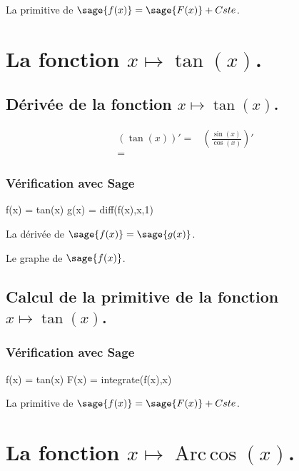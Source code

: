 \documentclass[a4paper,14pt]{extreport} %
\renewcommand{\arccos}{\mathop{\mathrm{Arc\,cos}}}
\begin{document}
La primitive de $\sage{f(x)} = \sage{F(x)} + Cste $.



\section{La fonction  $x \mapsto \tan(x)$.}

\subsection{Dérivée de la fonction $x \mapsto \tan(x)$.}


\begin{align*}
(\tan(x))' = & \left(\frac{\sin(x)}{\cos(x)}\right)' \\ = &
\end{align*}

\subsubsection{Vérification avec Sage}


\begin{sageblock}
    f(x) = tan(x)
    g(x) = diff(f(x),x,1)
\end{sageblock}

La dérivée de $\sage{f(x)} = \sage{g(x)} $.

Le graphe de $\sage{f(x)} $.



\subsection{Calcul de la primitive de la fonction  $x \mapsto \tan(x)$.}


\subsubsection{Vérification avec Sage}


\begin{sageblock}
    f(x) = tan(x)
    F(x) = integrate(f(x),x)
\end{sageblock}

La primitive de $\sage{f(x)} = \sage{F(x)} + Cste $.





\section{La fonction  $x \mapsto \arccos(x) $.}
\end{document}
